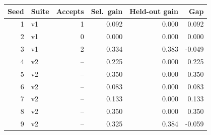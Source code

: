 \begin{tabular}{rlrrrr}
\toprule
Seed & Suite & Accepts & Sel.\ gain & Held-out gain & Gap \\
\midrule
1 & v1 & 1 & 0.092 & 0.000 & 0.092 \\
2 & v1 & 0 & 0.000 & 0.000 & 0.000 \\
3 & v1 & 2 & 0.334 & 0.383 & -0.049 \\
4 & v2 & -- & 0.225 & 0.000 & 0.225 \\
5 & v2 & -- & 0.350 & 0.000 & 0.350 \\
6 & v2 & -- & 0.083 & 0.000 & 0.083 \\
7 & v2 & -- & 0.133 & 0.000 & 0.133 \\
8 & v2 & -- & 0.350 & 0.000 & 0.350 \\
9 & v2 & -- & 0.325 & 0.384 & -0.059 \\
\bottomrule
\end{tabular}

